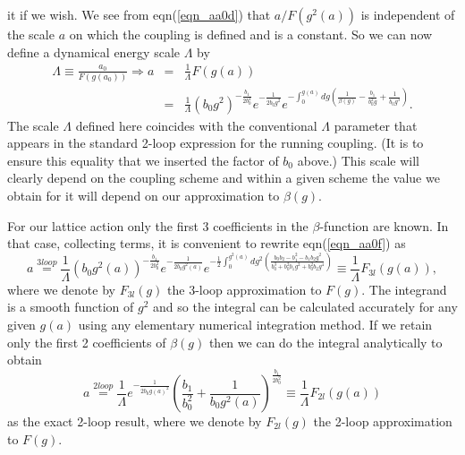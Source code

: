 \documentclass[12pt]{article}
\newcommand{\be}{\begin{equation}}
\newcommand{\ee}{\end{equation}}
\newcommand{\beq}{\begin{eqnarray}}
\newcommand{\eeq}{\end{eqnarray}}
\begin{document}
\begin{appendix}
it if we wish. We see from eqn(\ref{eqn_aa0d}) that $a/F(g^2(a))$ is
independent of the scale $a$ on which the coupling is defined and is a constant.
So we can now define a dynamical energy scale $\Lambda$ by
%
\beq
\Lambda \equiv \frac{a_0}{F(g(a_0))}
\Longrightarrow
a & = & \frac{1}{\Lambda} F(g(a)) \nonumber \\
& = &
\frac{1}{\Lambda} 
\left(b_0g^2\right)^{-\frac{b_1}{2b^2_0}}
e^{-\frac{1}{2b_0g^2}}
e^{-\int^{g(a)}_0 dg \left(\frac{1}{\beta(g)}
 - \frac{b_1}{b^2_0 g} + \frac{1}{b_0 g^3}
 \right) }.
\label{eqn_aa0f}
\eeq
%
The scale $\Lambda$ defined here coincides with the conventional $\Lambda$ parameter
that appears in the standard 2-loop expression for the running coupling.
(It is to ensure this equality that we inserted the factor of $b_0$ above.)
This scale will clearly depend on the coupling scheme and within a given scheme
the value we obtain for it will depend on our approximation to $\beta(g)$. 

For our lattice action  only the first 3 coefficients in the
$\beta$-function are known. In that case, collecting terms, it is convenient
to rewrite eqn(\ref{eqn_aa0f}) as
%
\be
a
\stackrel{3 loop}{=}
\frac{1}{\Lambda} 
\left(b_0g^2(a)\right)^{-\frac{b_1}{2b^2_0}}
e^{-\frac{1}{2b_0g^2(a)}}
e^{-\frac{1}{2} \int^{g^2(a)}_0 dg^2
\left(\frac{b_0b_2-b^2_1-b_1b_2g^2}{b^3_0+b^2_0b_1g^2+b^2_0b_2g^4}
\right) }
\equiv
\frac{1}{\Lambda} F_{3l}(g(a)),
\label{eqn_ag3loop}
\ee
%
where we denote by $F_{3l}(g)$ the 3-loop approximation to $F(g)$.
The integrand is a smooth function of $g^2$ and so the integral can be calculated
accurately for any given $g(a)$ using any elementary numerical integration
method. If we retain only the first 2 coefficients of $\beta(g)$ then we can
do the integral analytically to obtain
%
\be
a
\stackrel{2 loop}{=}
\frac{1}{\Lambda} 
e^{-\frac{1}{2b_0g(a)^2}}
\left(\frac{b_1}{b^2_0}+\frac{1}{b_0g^2(a)}\right)^{\frac{b_1}{2b^2_0}}
\equiv
\frac{1}{\Lambda} F_{2l}(g(a))
\label{eqn_ag2loop}
\ee
%
as the exact 2-loop result, where we denote by $F_{2l}(g)$ the 2-loop approximation to
$F(g)$.


\end{appendix}
\end{document}
